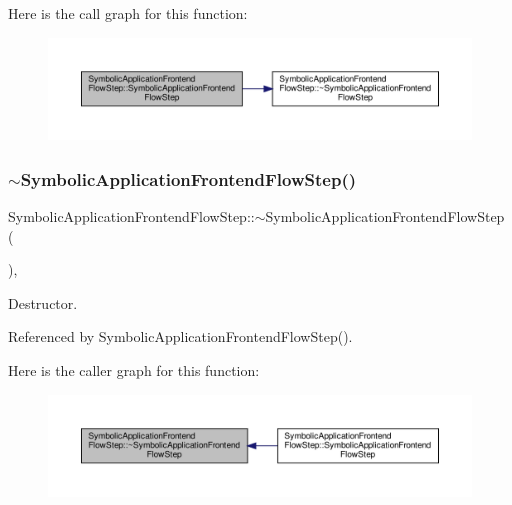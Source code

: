 Here is the call graph for this function\+:
\nopagebreak
\begin{figure}[H]
\begin{center}
\leavevmode
\includegraphics[width=350pt]{d5/dad/classSymbolicApplicationFrontendFlowStep_a80ea7eea8b5aebb0c08e06a174a184fd_cgraph}
\end{center}
\end{figure}
\mbox{\label{classSymbolicApplicationFrontendFlowStep_af61a1ce5df749b66af0188bc604bce95}} 
\subsubsection{\texorpdfstring{$\sim$\+Symbolic\+Application\+Frontend\+Flow\+Step()}{~SymbolicApplicationFrontendFlowStep()}}
{\footnotesize\ttfamily Symbolic\+Application\+Frontend\+Flow\+Step\+::$\sim$\+Symbolic\+Application\+Frontend\+Flow\+Step (\begin{DoxyParamCaption}{ }\end{DoxyParamCaption})\hspace{0.3cm}{\ttfamily [override]}, {\ttfamily [default]}}



Destructor. 



Referenced by Symbolic\+Application\+Frontend\+Flow\+Step().

Here is the caller graph for this function\+:
\nopagebreak
\begin{figure}[H]
\begin{center}
\leavevmode
\includegraphics[width=350pt]{d5/dad/classSymbolicApplicationFrontendFlowStep_af61a1ce5df749b66af0188bc604bce95_icgraph}
\end{center}
\end{figure}


